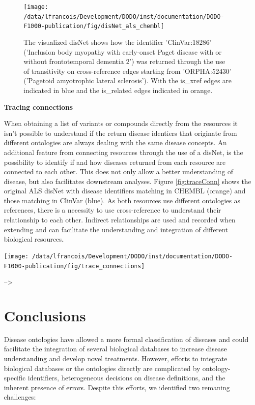 \documentclass[9pt,a4paper,]{extarticle}
\begin{document}
\begin{figure}

{\centering \texttt{[image: /data/lfrancois/Development/DODO/inst/documentation/DODO-F1000-publication/fig/disNet\_als\_chembl]} 

}

\caption{The visualized disNet shows how the identifier 'ClinVar:18286' ('Inclusion body myopathy with early-onset Paget disease with or without frontotemporal dementia 2') was returned through the use of transitivity on cross-reference edges starting from 'ORPHA:52430' ('Pagetoid amyotrophic lateral sclerosis'). With the is\_xref edges are indicated in blue and the is\_related edges indicated in orange.}\label{fig:disnetALSclinvar}
\end{figure}

\textbf{Tracing connections}

When obtaining a list of variants or compounds directly from the resources it isn't possible to understand if the return disease identiers that originate from different ontologies are always dealing with the same disease concepts. An additional feature from connecting resources through the use of a disNet, is the possibility to identify if and how diseases returned from each resource are connected to each other. This does not only allow a better understanding of disease, but also facilitates downstream analyses. Figure \ref{fig:traceConn} shows the original ALS disNet with disease identifiers matching in CHEMBL (orange) and those matching in ClinVar (blue). As both resources use different ontologies as references, there is a necessity to use cross-reference to understand their relationship to each other. Indirect relationships are used and recorded when extending and can facilitate the understanding and integration of different biological resources.

\begin{center}\texttt{[image: /data/lfrancois/Development/DODO/inst/documentation/DODO-F1000-publication/fig/trace\_connections]} \end{center}

--\textgreater{}

\hypertarget{conclusions}{%
\section{Conclusions}\label{conclusions}}

Disease ontologies have allowed a more formal classification of diseases and could facilitate the integration of several biological databases to increase disease understanding and develop novel treatments. However, efforts to integrate biological databases or the ontologies directly are complicated by ontology-specific identifiers, heterogeneous decisions on disease definitions, and the inherent presence of errors. Despite this efforts, we identified two remaning challenges:
\end{document}
